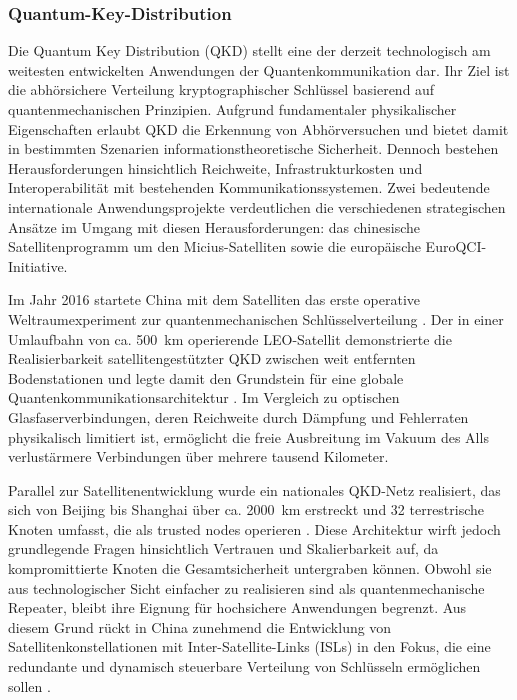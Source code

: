 \subsubsection{Quantum-Key-Distribution}

Die Quantum Key Distribution (QKD) stellt eine der derzeit technologisch am weitesten entwickelten Anwendungen der Quantenkommunikation dar. Ihr Ziel ist die abhörsichere Verteilung kryptographischer Schlüssel basierend auf quantenmechanischen Prinzipien. Aufgrund fundamentaler physikalischer Eigenschaften erlaubt QKD die Erkennung von Abhörversuchen und bietet damit in bestimmten Szenarien informationstheoretische Sicherheit. Dennoch bestehen Herausforderungen hinsichtlich Reichweite, Infrastrukturkosten und Interoperabilität mit bestehenden Kommunikationssystemen. Zwei bedeutende internationale Anwendungsprojekte verdeutlichen die verschiedenen strategischen Ansätze im Umgang mit diesen Herausforderungen: das chinesische Satellitenprogramm um den Micius-Satelliten sowie die europäische EuroQCI-Initiative.

Im Jahr 2016 startete China mit dem Satelliten \cite{courtland_chinas_2016} das erste operative Weltraumexperiment zur quantenmechanischen Schlüsselverteilung \cite{courtland_chinas_2016}. Der in einer Umlaufbahn von ca. 500~km operierende LEO-Satellit demonstrierte die Realisierbarkeit satellitengestützter QKD zwischen weit entfernten Bodenstationen und legte damit den Grundstein für eine globale Quantenkommunikationsarchitektur \cite{wang_modeling_2021}. Im Vergleich zu optischen Glasfaserverbindungen, deren Reichweite durch Dämpfung und Fehlerraten physikalisch limitiert ist, ermöglicht die freie Ausbreitung im Vakuum des Alls verlustärmere Verbindungen über mehrere tausend Kilometer.

Parallel zur Satellitenentwicklung wurde ein nationales QKD-Netz realisiert, das sich von Beijing bis Shanghai über ca. 2000~km erstreckt und 32 terrestrische Knoten umfasst, die als trusted nodes operieren \cite{wang_modeling_2021}. Diese Architektur wirft jedoch grundlegende Fragen hinsichtlich Vertrauen und Skalierbarkeit auf, da kompromittierte Knoten die Gesamtsicherheit untergraben können. Obwohl sie aus technologischer Sicht einfacher zu realisieren sind als quantenmechanische Repeater, bleibt ihre Eignung für hochsichere Anwendungen begrenzt. Aus diesem Grund rückt in China zunehmend die Entwicklung von Satellitenkonstellationen mit Inter-Satellite-Links (ISLs) in den Fokus, die eine redundante und dynamisch steuerbare Verteilung von Schlüsseln ermöglichen sollen \cite{wang_modeling_2021}.

